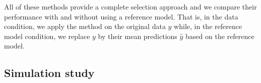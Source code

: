 \documentclass[a4]{article}
\theoremstyle{definition}
\newcommand{\note}[1]{\textcolor{red}{#1}}
\begin{document}
All of these methods provide a complete selection approach and we
compare their performance with and without using a reference model.
That is, in the data condition, we apply the method on the original
data $y$ while, in the reference model condition, we replace $y$ by
their mean predictions $\hat{y}$ based on the reference model.
  



\subsection{Simulation study}
\label{simulations}
\end{document}
